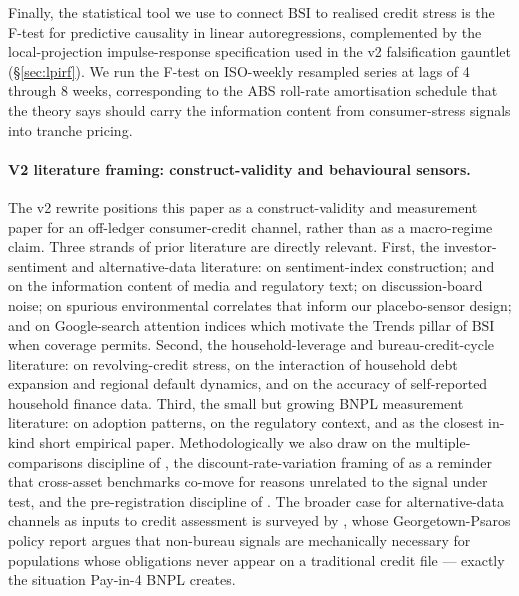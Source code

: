 \documentclass[11pt,letterpaper]{article}
\newcommand{\bsi}{\text{BSI}}
\begin{document}
Finally, the statistical tool we use to connect $\bsi$ to realised
credit stress is the \citet{granger1969investigating} F-test for
predictive causality in linear autoregressions, complemented by the
\citet{jorda2005estimation} local-projection impulse-response
specification used in the v2 falsification gauntlet
(\S\ref{sec:lpirf}). We run the F-test on ISO-weekly resampled series
at lags of 4 through 8 weeks, corresponding to the ABS roll-rate
amortisation schedule that the theory says should carry the
information content from consumer-stress signals into tranche
pricing.

\paragraph{V2 literature framing: construct-validity and behavioural
sensors.} The v2 rewrite positions this paper as a construct-validity
and measurement paper for an off-ledger consumer-credit channel,
rather than as a macro-regime claim. Three strands of prior
literature are directly relevant. First, the investor-sentiment and
alternative-data literature:
\citet{baker2006investor,baker2007investor} on sentiment-index
construction; \citet{tetlock2007giving} and
\citet{loughran2011liability} on the information content of media and
regulatory text; \citet{antweiler2004allthat} on discussion-board
noise; \citet{hirshleifer2003good} on spurious environmental
correlates that inform our placebo-sensor design; and
\citet{da2011search,da2015sum} on Google-search attention indices
which motivate the Trends pillar of $\bsi$ when coverage permits.
Second, the household-leverage and bureau-credit-cycle literature:
\citet{gross2002consumer} on revolving-credit stress,
\citet{mian2009consequences,mian2011house,mian2014house} on the
interaction of household debt expansion and regional default
dynamics, and \citet{dehaan2024accuracy} on the accuracy of
self-reported household finance data. Third, the small but growing
BNPL measurement literature: \citet{dimaggio2022buy} on adoption
patterns, \citet{cfpb2023bnpl} on the regulatory context, and
\citet{guttman2023short} as the closest in-kind short empirical
paper. Methodologically we also draw on the
multiple-comparisons discipline of
\citet{harvey2016backtesting}, the discount-rate-variation framing of
\citet{cochrane2011discount} as a reminder that cross-asset
benchmarks co-move for reasons unrelated to the signal under test,
and the pre-registration discipline of \citet{romer2019guide}.
The broader case for alternative-data channels as inputs to
credit assessment is surveyed by \citet{georgetown2023altdata}, whose
Georgetown-Psaros policy report argues that non-bureau signals are
mechanically necessary for populations whose obligations never appear
on a traditional credit file --- exactly the situation Pay-in-4 BNPL
creates.
\end{document}
